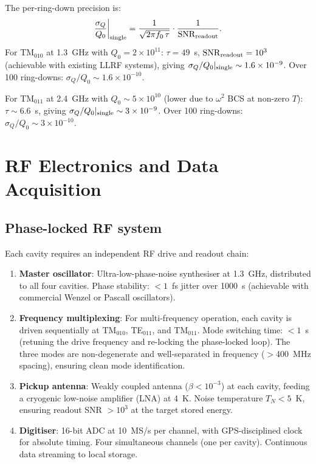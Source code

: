 \documentclass[11pt]{article}
\newcommand{\ee}[1]{\times 10^{#1}}
\newcommand{\SNR}{\mathrm{SNR}}
\begin{document}
The per-ring-down precision is:
\begin{equation}
\frac{\sigma_Q}{Q_0}\bigg|_{\rm single} = \frac{1}{\sqrt{2\pi f_0\,\tau}}
\cdot\frac{1}{\SNR_{\rm readout}}.
\end{equation}
For TM$_{010}$ at 1.3~GHz with $Q_0 = 2\ee{11}$: $\tau = 49$~s,
$\SNR_{\rm readout} = 10^3$ (achievable with existing LLRF systems),
giving $\sigma_Q/Q_0|_{\rm single} \sim 1.6\ee{-9}$. Over 100
ring-downs: $\sigma_Q/Q_0 \sim 1.6\ee{-10}$.

For TM$_{011}$ at 2.4~GHz with $Q_0 \sim 5\ee{10}$ (lower due to
$\omega^2$ BCS at non-zero $T$): $\tau \sim 6.6$~s, giving
$\sigma_Q/Q_0|_{\rm single} \sim 3\ee{-9}$. Over 100 ring-downs:
$\sigma_Q/Q_0 \sim 3\ee{-10}$.


\section{RF Electronics and Data Acquisition}
\label{sec:electronics}

\subsection{Phase-locked RF system}

Each cavity requires an independent RF drive and readout chain:

\begin{enumerate}[nosep]
\item \textbf{Master oscillator}: Ultra-low-phase-noise synthesiser at
  1.3~GHz, distributed to all four cavities. Phase stability: $<1$~fs
  jitter over 1000~s (achievable with commercial Wenzel or Pascall
  oscillators).

\item \textbf{Frequency multiplexing}: For multi-frequency operation,
  each cavity is driven sequentially at TM$_{010}$, TE$_{011}$, and
  TM$_{011}$. Mode switching time: $<1$~s (retuning the drive frequency
  and re-locking the phase-locked loop). The three modes are
  non-degenerate and well-separated in frequency ($>$400~MHz spacing),
  ensuring clean mode identification.

\item \textbf{Pickup antenna}: Weakly coupled antenna ($\beta < 10^{-3}$)
  at each cavity, feeding a cryogenic low-noise amplifier (LNA) at
  4~K. Noise temperature $T_N < 5$~K, ensuring readout SNR $> 10^3$
  at the target stored energy.

\item \textbf{Digitiser}: 16-bit ADC at 10~MS/s per channel, with
  GPS-disciplined clock for absolute timing. Four simultaneous channels
  (one per cavity). Continuous data streaming to local storage.
\end{enumerate}
\end{document}
